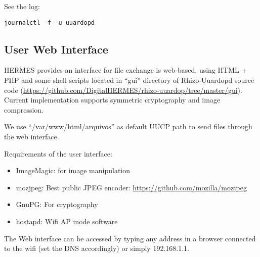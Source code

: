 \documentclass[11pt,a4paper]{article}
\begin{document}
See the log:
\begin{verbatim}
journalctl -f -u uuardopd
\end{verbatim}





\subsection{User Web Interface}

HERMES provides an interface for file exchange is web-based, using HTML + PHP and
some shell scripts located in ``gui'' directory of Rhizo-Uuardopd source
code
(\url{https://github.com/DigitalHERMES/rhizo-uuardop/tree/master/gui}). Current
implementation supports symmetric cryptography and image compression.

We use ``/var/www/html/arquivos'' as default UUCP path to send
files through the web interface.

Requirements of the user interface:

\begin{itemize}
\item ImageMagic: for image manipulation
\item mozjpeg: Best public JPEG encoder: \url{https://github.com/mozilla/mozjpeg}
\item GnuPG: For cryptography
\item hostapd: Wifi AP mode software
\end{itemize}

The Web interface can be accessed by typing any address in a browser
connected to the wifi (set the DNS accordingly) or simply 192.168.1.1.






\end{document}
